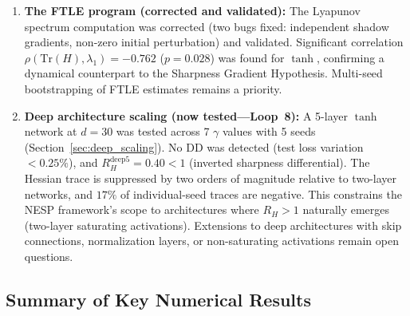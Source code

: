 \documentclass[
  journal=largetwo,
  simfonts=false,
  year=2025,
  volume=37,
]{cup-journal}
\begin{document}
\begin{enumerate}
    \item \textbf{The FTLE program (corrected and validated):} The Lyapunov spectrum computation was corrected (two bugs fixed: independent shadow gradients, non-zero initial perturbation) and validated. Significant correlation $\rho(\mathrm{Tr}(H), \lambda_1) = -0.762$ ($p=0.028$) was found for $\tanh$, confirming a dynamical counterpart to the Sharpness Gradient Hypothesis. Multi-seed bootstrapping of FTLE estimates remains a priority.
    
    \item \textbf{Deep architecture scaling (now tested---Loop~8):} A 5-layer $\tanh$ network at $d=30$ was tested across 7 $\gamma$ values with 5 seeds (Section~\ref{sec:deep_scaling}). No DD was detected (test loss variation $<0.25\%$), and $R_H^{\mathrm{deep5}} = 0.40 < 1$ (inverted sharpness differential). The Hessian trace is suppressed by two orders of magnitude relative to two-layer networks, and $17\%$ of individual-seed traces are negative. This constrains the NESP framework's scope to architectures where $R_H > 1$ naturally emerges (two-layer saturating activations). Extensions to deep architectures with skip connections, normalization layers, or non-saturating activations remain open questions.
\end{enumerate}

\subsection{Summary of Key Numerical Results}
\end{document}
